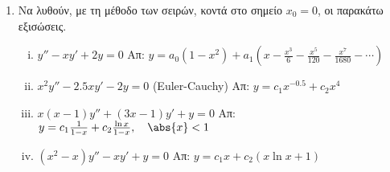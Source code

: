


\pagestyle{askhseis}
\everymath{\displaystyle}





\begin{center}
\end{center}

\vspace{\baselineskip}

\begin{enumerate}
  \item Να λυθούν, με τη μέθοδο των σειρών, κοντά στο σημείο $ x_{0}=0 $, οι παρακάτω 
    εξισώσεις.
    \begin{enumerate}[i)]
      \item $ y'' -xy'+2y=0 $
        \hfill Απ: $ y = a_{0}\left(1-x^{2}\right) + a_{1}
        \left(x - \frac{x^{3}}{6} - \frac{x^{5}}{120} - \frac{x^{7}}{1680} - 
        \cdots \right) $ 

      \item  $ x^{2}y'' - 2.5 x y' -2y=0 $ \quad (Euler-Cauchy)
        \hfill Απ: $ y = c_{1}x^{-0.5}+ c_{2}x^{4} $ 

      \item $ x(x-1)y''+(3x-1)y'+y=0 $ 
        \hfill Απ: $ y= c_{1} \frac{1}{1-x} + c_{2} \frac{\ln{x}}{1-x}, 
        \quad \abs{x} <1$ 

      \item $ (x^{2}-x)y'' -xy'+y=0 $
        \hfill Απ:  $ y= c_{1}x + c_{2}(x \ln{x} + 1) $
    \end{enumerate}
\end{enumerate}


